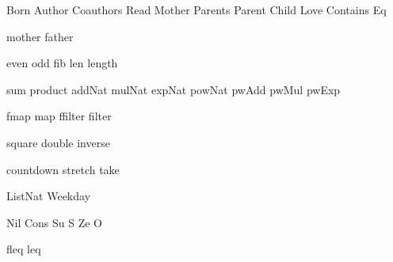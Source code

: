 
\DefRel Born
\DefRel Author
\DefRel Coauthors
\DefRel Read
\DefRel Mother
\DefRel Parents
\DefRel Parent
\DefRel Child
\DefRel Love
\DefRel Contains
\DefRel Eq

\DefFun mother
\DefFun father

\DefFun even
\DefFun odd
\DefFun fib
\DefFun len
\DefFun length

\DefFun sum
\DefFun product
\DefFun addNat
\DefFun mulNat
\DefFun expNat
\DefFun powNat
\DefFun pwAdd
\DefFun pwMul
\DefFun pwExp

\DefFUN fmap map
\DefFUN ffilter filter

\DefFun square
\DefFun double
\DefFun inverse

\DefFpf countdown
\DefFpf stretch
\DefFpf take

\DefType ListNat
\DefType Weekday

\DefCons Nil
\DefCons Cons
\DefCONS Su S
\DefCONS Ze O

\DefFUN fleq leq

\def\bla{\mathrm{bla}}
\def\blu{\mathrm{blu}}

\def\persons{{\cal P}}
\let\pers=\persons

\def\euclid{\algorithmstylize{Euclid}}%

\def\Smile{\rel{\woohoo}}
\def\Frown{\rel{\boohoo}}

\def\oddAs#1{A_{[#1]}}

